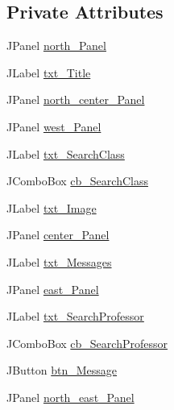 \subsection*{Private Attributes}
\begin{DoxyCompactItemize}
\item 
J\+Panel \mbox{\hyperlink{classcom_1_1_b_n_u_1_1pages_1_1main_1_1_main_model_af25da6623245f08c0488f548694eccdf}{north\+\_\+\+Panel}}
\item 
J\+Label \mbox{\hyperlink{classcom_1_1_b_n_u_1_1pages_1_1main_1_1_main_model_aeec023ac543ff319a137e43686bf6016}{txt\+\_\+\+Title}}
\item 
J\+Panel \mbox{\hyperlink{classcom_1_1_b_n_u_1_1pages_1_1main_1_1_main_model_aa78c2baa37911a78c9516ed20ea8963f}{north\+\_\+center\+\_\+\+Panel}}
\item 
J\+Panel \mbox{\hyperlink{classcom_1_1_b_n_u_1_1pages_1_1main_1_1_main_model_ab47d8a4899e911ca0cea0a15c7eb6278}{west\+\_\+\+Panel}}
\item 
J\+Label \mbox{\hyperlink{classcom_1_1_b_n_u_1_1pages_1_1main_1_1_main_model_a05f13f06052fa12105395030f010fa48}{txt\+\_\+\+Search\+Class}}
\item 
J\+Combo\+Box \mbox{\hyperlink{classcom_1_1_b_n_u_1_1pages_1_1main_1_1_main_model_a0a5b18be10fe22b2ea92e6914a66042f}{cb\+\_\+\+Search\+Class}}
\item 
J\+Label \mbox{\hyperlink{classcom_1_1_b_n_u_1_1pages_1_1main_1_1_main_model_ac16a51431b0a713186eafae4c5e4477a}{txt\+\_\+\+Image}}
\item 
J\+Panel \mbox{\hyperlink{classcom_1_1_b_n_u_1_1pages_1_1main_1_1_main_model_a834146f50854e68faf7e7e4918dfb4f3}{center\+\_\+\+Panel}}
\item 
J\+Label \mbox{\hyperlink{classcom_1_1_b_n_u_1_1pages_1_1main_1_1_main_model_a21950f3aa82612e6592b7ce9655d9a76}{txt\+\_\+\+Messages}}
\item 
J\+Panel \mbox{\hyperlink{classcom_1_1_b_n_u_1_1pages_1_1main_1_1_main_model_a46bba40d2a6a7e6940cd1b8081ce343e}{east\+\_\+\+Panel}}
\item 
J\+Label \mbox{\hyperlink{classcom_1_1_b_n_u_1_1pages_1_1main_1_1_main_model_a6560d740e27ddcf5d51c3ba543900e09}{txt\+\_\+\+Search\+Professor}}
\item 
J\+Combo\+Box \mbox{\hyperlink{classcom_1_1_b_n_u_1_1pages_1_1main_1_1_main_model_a251d38b91ccc0e8e80942454b3431afd}{cb\+\_\+\+Search\+Professor}}
\item 
J\+Button \mbox{\hyperlink{classcom_1_1_b_n_u_1_1pages_1_1main_1_1_main_model_af7e3b991afa64d4ff4be1b42f009d329}{btn\+\_\+\+Message}}
\item 
J\+Panel \mbox{\hyperlink{classcom_1_1_b_n_u_1_1pages_1_1main_1_1_main_model_ad5cdf3cbd8a0b3d86769786ad6b39604}{north\+\_\+east\+\_\+\+Panel}}
\end{DoxyCompactItemize}


